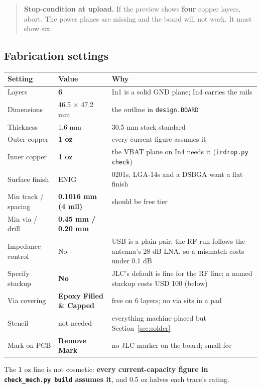 \documentclass[11pt,a4paper]{article}
\newcommand{\file}[1]{\texttt{\small #1}}
\newcommand{\flag}[1]{\textcolor{warnred}{\textbf{#1}}}
\begin{document}
\begin{quote}
\flag{Stop-condition at upload.} If the preview shows \textbf{four} copper layers, abort.
The power planes are missing and the board will not work. It must show six.
\end{quote}

\subsection{Fabrication settings}

\begin{center}
\begin{tabular}{@{}lll@{}}
\toprule
\textbf{Setting} & \textbf{Value} & \textbf{Why} \\
\midrule
Layers & \textbf{6} & In1 is a solid GND plane; In4 carries the rails \\
Dimensions & 46.5 $\times$ 47.2 mm & the outline in \file{design.BOARD} \\
Thickness & 1.6 mm & 30.5 mm stack standard \\
Outer copper & \textbf{1 oz} & every current figure assumes it \\
Inner copper & \textbf{1 oz} & the VBAT plane on In4 needs it (\file{irdrop.py check}) \\
Surface finish & ENIG & 0201s, LGA-14s and a DSBGA want a flat finish \\
Min track / spacing & \textbf{0.1016 mm (4 mil)} & should be free tier \\
Min via / drill & \textbf{0.45 mm / 0.20 mm} & \\
Impedance control & No & USB is a plain pair; the RF run follows the antenna's 28 dB LNA, so a mismatch costs under 0.1 dB \\
Specify stackup & \textbf{No} & JLC's default is fine for the RF line; a named stackup costs USD 100 (below) \\
Via covering & \textbf{Epoxy Filled \& Capped} & free on 6 layers; no via sits in a pad \\
Stencil & not needed & everything machine-placed but Section~\ref{sec:solder} \\
Mark on PCB & \textbf{Remove Mark} & no JLC marker on the board; small fee \\
\bottomrule
\end{tabular}
\end{center}

The 1 oz line is not cosmetic: \flag{every current-capacity figure in
\file{check\_mech.py build} assumes it}, and 0.5 oz halves each trace's rating.
\end{document}
